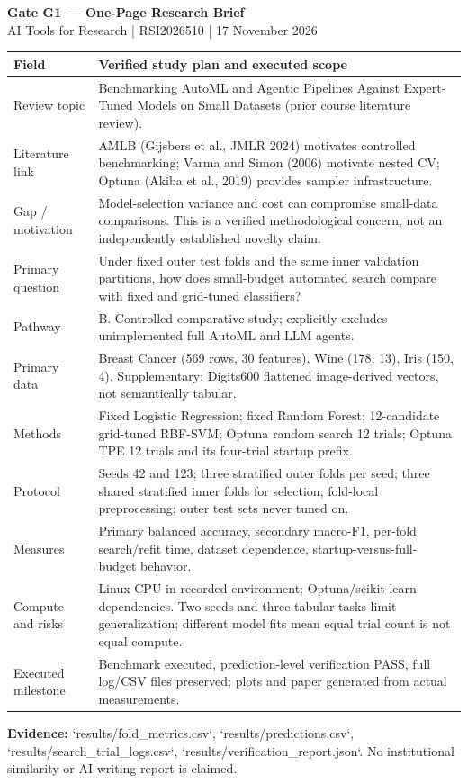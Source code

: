 \documentclass[10pt,a4paper]{article}
\begin{document}
\begin{center}{\Large\bfseries Gate G1 --- One-Page Research Brief}\\[3pt]
AI Tools for Research | RSI2026510 | 17 November 2026\end{center}
\small
\begin{tabularx}{\textwidth}{p{3.05cm}X}\toprule
\textbf{Field} & \textbf{Verified study plan and executed scope}\\\midrule
Review topic & Benchmarking AutoML and Agentic Pipelines Against Expert-Tuned Models on Small Datasets (prior course literature review).\\
Literature link & AMLB (Gijsbers et al., JMLR 2024) motivates controlled benchmarking; Varma and Simon (2006) motivate nested CV; Optuna (Akiba et al., 2019) provides sampler infrastructure.\\
Gap / motivation & Model-selection variance and cost can compromise small-data comparisons. This is a verified methodological concern, not an independently established novelty claim.\\
Primary question & Under fixed outer test folds and the same inner validation partitions, how does small-budget automated search compare with fixed and grid-tuned classifiers?\\
Pathway & B. Controlled comparative study; explicitly excludes unimplemented full AutoML and LLM agents.\\
Primary data & Breast Cancer (569 rows, 30 features), Wine (178, 13), Iris (150, 4). Supplementary: Digits600 flattened image-derived vectors, not semantically tabular.\\
Methods & Fixed Logistic Regression; fixed Random Forest; 12-candidate grid-tuned RBF-SVM; Optuna random search 12 trials; Optuna TPE 12 trials and its four-trial startup prefix.\\
Protocol & Seeds 42 and 123; three stratified outer folds per seed; three shared stratified inner folds for selection; fold-local preprocessing; outer test sets never tuned on.\\
Measures & Primary balanced accuracy, secondary macro-F1, per-fold search/refit time, dataset dependence, startup-versus-full-budget behavior.\\
Compute and risks & Linux CPU in recorded environment; Optuna/scikit-learn dependencies. Two seeds and three tabular tasks limit generalization; different model fits mean equal trial count is not equal compute.\\
Executed milestone & Benchmark executed, prediction-level verification PASS, full log/CSV files preserved; plots and paper generated from actual measurements.\\
\bottomrule
\end{tabularx}
\vspace{4pt}\textbf{Evidence:} `results/fold\_metrics.csv`, `results/predictions.csv`, `results/search\_trial\_logs.csv`, `results/verification\_report.json`. No institutional similarity or AI-writing report is claimed.
\end{document}
